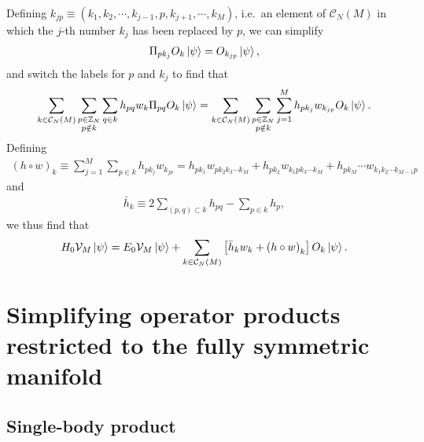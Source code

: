 \documentclass[nofootinbib,notitlepage,11pt]{revtex4-2}
\newcommand{\p}[1]{\left(#1\right)} %
\renewcommand{\sp}[1]{\left[#1\right]} %
\newcommand{\1}{\mathds{1}}
\newcommand{\C}{\mathcal{C}}
\newcommand{\V}{\mathcal{V}}
\newcommand{\ZZ}{\mathbb{Z}}
\begin{document}
Defining
$k_{jp}\equiv\p{k_1,k_2,\cdots,k_{j-1},p,k_{j+1},\cdots,k_M}$, i.e.~an
element of $\C_N\p{M}$ in which the $j$-th number $k_j$ has been
replaced by $p$, we can simplify
\begin{align}
  \Pi_{p k_j} O_k \ket\psi = O_{k_{jp}}\ket\psi,
\end{align}
and switch the labels for $p$ and $k_j$ to find that
\begin{align}
  \sum_{k\in\C_N\p{M}} \sum_{\substack{p\in\ZZ_N\\p\notin k}} \sum_{q\in k}
  h_{pq} w_k  \Pi_{pq} O_k \ket\psi
  = \sum_{k\in\C_N\p{M}} \sum_{\substack{p\in\ZZ_N\\p\notin k}}
  \sum_{j=1}^M h_{pk_j} w_{k_{jp}} O_k \ket\psi.
\end{align}
Defining
\begin{align}
  \p{h\circ w}_k
  \equiv \sum_{j=1}^M \sum_{p\in k} h_{pk_j} w_{k_{jp}}
  = h_{pk_1} w_{pk_2k_3\cdots k_M}
  + h_{pk_2} w_{k_1pk_3\cdots k_M}
  + h_{pk_M} \cdots w_{k_1k_2\cdots k_{M-1} p}
\end{align}
and
\begin{align}
  \bar h_k \equiv 2 \sum_{\p{p,q}\subset k} h_{pq} - \sum_{p\in k} h_p,
\end{align}
we thus find that
\begin{align}
  H_0 \V_M \ket\psi
  = E_0 \V_M \ket\psi + \sum_{k\in\C_N\p{M}}
  \sp{\bar h_k w_k + \p{h\circ w}_k} O_k \ket\psi.
\end{align}

\section{Simplifying operator products restricted to the fully
  symmetric manifold}
\label{sec:sym_prod}

\subsection{Single-body product}
\label{sec:PXYP}
\end{document}
